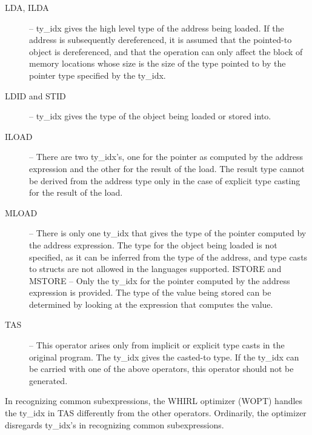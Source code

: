 \begin{description}
%
%
\item[LDA, ILDA] -- ty\_idx gives the high level type of the address
being loaded. If the address is subsequently dereferenced, it is
assumed that the pointed-to object is dereferenced, and that the
operation can only affect the block of memory locations whose size
is the size of the type pointed to by the pointer type specified
by the ty\_idx. 

%
%
\item[LDID and STID] -- ty\_idx gives the type of the object
being loaded or stored into.

%
\item[ILOAD] -- There are two ty\_idx's, one for the pointer as computed
by the address expression and the other for the result of the load.
The result type cannot be derived from the address type only in
the case of explicit type casting for the result of the load.

%
\item[MLOAD] -- There is only one ty\_idx that gives the type of the
pointer computed by the address expression. The type for the object
being loaded is not specified, as it can be inferred from the type
of the address, and type casts to structs are not allowed in the
languages supported.
%
ISTORE and
%
MSTORE -- Only the ty\_idx for the
pointer computed by the address expression is provided. The type of
the value being stored can be determined by looking at the expression
that computes the value.

%
\item[TAS] -- This operator arises only from implicit or explicit type
casts in the original program. The ty\_idx gives the casted-to type.
If the ty\_idx can be carried with one of the above operators, this
operator should not be generated.
\end{description}

In recognizing common subexpressions, the WHIRL optimizer (WOPT) handles
the ty\_idx in
TAS differently from the other operators. Ordinarily, the optimizer
disregards ty\_idx's in recognizing common subexpressions.

